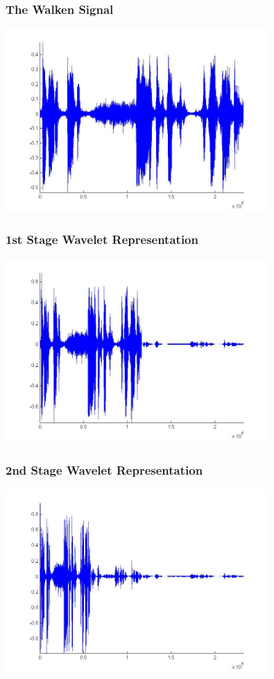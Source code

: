 \documentclass[10pt]{beamer}
\begin{document}
\begin{frame}
\frametitle{The Walken Signal}
\includegraphics[height=7cm]{stage0}
\end{frame}

\begin{frame}
\frametitle{1st Stage Wavelet Representation}
\includegraphics[height=7cm]{stage1}
\end{frame}

\begin{frame}
\frametitle{2nd Stage Wavelet Representation}
\includegraphics[height=7cm]{stage2}
\end{frame}
\end{document}
